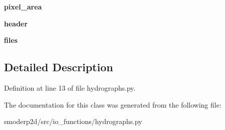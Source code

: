 \begin{DoxyCompactItemize}
\item 
\hypertarget{classsmoderp2d_1_1src_1_1io__functions_1_1hydrographs_1_1Hydrographs_a2ba88b55e9014ae1591c0d687b429248}{{\bfseries pixel\-\_\-area}}\label{classsmoderp2d_1_1src_1_1io__functions_1_1hydrographs_1_1Hydrographs_a2ba88b55e9014ae1591c0d687b429248}

\item 
\hypertarget{classsmoderp2d_1_1src_1_1io__functions_1_1hydrographs_1_1Hydrographs_a699682863e80d885651ab31f68949e0d}{{\bfseries header}}\label{classsmoderp2d_1_1src_1_1io__functions_1_1hydrographs_1_1Hydrographs_a699682863e80d885651ab31f68949e0d}

\item 
\hypertarget{classsmoderp2d_1_1src_1_1io__functions_1_1hydrographs_1_1Hydrographs_a656de4c1982efe371c36388bef0ec844}{{\bfseries files}}\label{classsmoderp2d_1_1src_1_1io__functions_1_1hydrographs_1_1Hydrographs_a656de4c1982efe371c36388bef0ec844}

\end{DoxyCompactItemize}


\subsection{Detailed Description}


Definition at line 13 of file hydrographs.\-py.



The documentation for this class was generated from the following file\-:\begin{DoxyCompactItemize}
\item 
smoderp2d/src/io\-\_\-functions/hydrographs.\-py\end{DoxyCompactItemize}
